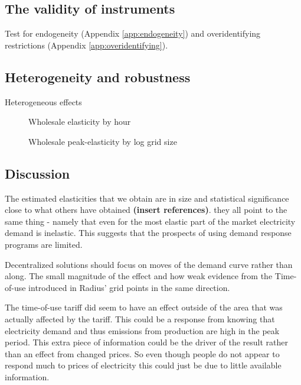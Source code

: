 \subsection{The validity of instruments}
\label{subsec:r_validity}
Test for endogeneity (Appendix \ref{app:endogeneity}) and overidentifying restrictions (Appendix \ref{app:overidentifying}).
\medskip\\


\subsection{Heterogeneity and robustness}
\label{subsec:r_robustness}


Heterogeneous effects
\begin{figure}[H]
  \centering
  \caption{Wholesale elasticity by hour}
  \label{fig:ws_elasticity_hour}
\end{figure}

\begin{figure}[H]
  \centering
  \caption{Wholesale peak-elasticity by log grid size}
  \label{fig:ws_elasticity_grid}
\end{figure}


\subsection{Discussion}
\label{subsec:r_discussion}

The estimated elasticities that we obtain are in size and statistical significance close to what others have obtained\textbf{ (insert references)}.  they all point to the same thing - namely that even for the most elastic part of the market electricity demand is inelastic. This suggests that the prospects of using demand response programs are limited. 

Decentralized solutions should focus on moves of the demand curve rather than along. 
The small magnitude of the effect and how weak evidence from the Time-of-use introduced in Radius' grid points in the same direction. 
\par

The time-of-use tariff did seem to have an effect outside of the area that was actually affected by the tariff. This could be a response from knowing that electricity demand and thus emissions from production are high in the peak period. This extra piece of information could be the driver of the result rather than an effect from changed prices. So even though people do not appear to respond much to prices of electricity this could just be due to little available information. 
\par

